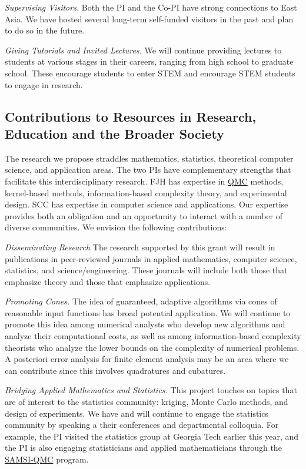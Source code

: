 \documentclass[11pt]{NSFamsart}
\newcommand{\QMC}{\hyperlink{QMClink}{QMC}\xspace}
\newcommand{\SAMSIQMC}{\hyperlink{SAMSIlink}{SAMSI-QMC}\xspace}
\begin{document}
\emph{Supervising Visitors.}
Both the PI and the Co-PI have strong connections to East Asia.  We have hosted several long-term 
self-funded visitors in the past and plan to do so in the future.

\emph{Giving Tutorials and Invited Lectures.}
We will continue providing lectures to students at various stages in their careers, ranging from high 
school to graduate school. These encourage students to enter STEM and encourage STEM students 
to engage in research.


\subsection{Contributions to Resources in Research, Education and the Broader Society} 
\label{BroaderTwoSec}

The research we propose straddles mathematics, statistics, theoretical computer science, and 
application 
areas.  The two PIs have complementary strengths that facilitate this interdisciplinary research.  FJH 
has expertise in \QMC methods, kernel-based methods, information-based complexity 
theory, and experimental design. SCC has expertise in computer science and applications.  Our 
expertise provides both an obligation and an opportunity to interact with a number of diverse 
communities. We envision the following contributions:

\emph{Disseminating Research}
The research supported by this grant will result in publications in peer-reviewed journals in applied 
mathematics, computer science, statistics, and science/engineering. These 
journals will include both those that emphasize theory and those that emphasize applications.

\emph{Promoting Cones.} The idea of guaranteed, adaptive algorithms via cones of reasonable input 
functions 
has broad potential application.  We will continue to promote this idea among numerical analysts 
who 
develop new algorithms and analyze their computational costs, as well as among information-based 
complexity theorists who analyze the lower bounds on the complexity of numerical problems.  A 
posteriori error analysis for finite element analysis may be an area where we can contribute since 
this involves quadratures and cubatures.

\emph{Bridging Applied Mathematics and Statistics.}
This project touches on topics that are of interest to the statistics community: kriging, Monte Carlo 
methods, and design of experiments.  We have and will continue to engage the statistics community 
by speaking a their conferences and departmental colloquia.  For example, the PI visited the 
statistics group at Georgia Tech earlier this year, and the PI is also engaging statisticians and 
applied mathematicians through the \SAMSIQMC program.
\end{document}
